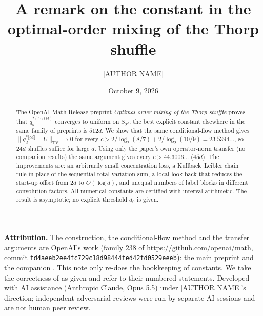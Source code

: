 \documentclass[11pt]{amsart}
\title[Thorp shuffle: a smaller explicit constant]{A remark on the constant in the optimal-order mixing of the Thorp shuffle}
\author{[AUTHOR NAME]}
\date{October 9, 2026}
\theoremstyle{remark}
\newcommand{\TV}{\mathrm{TV}}
\begin{document}
\begin{abstract}
The OpenAI Math Release preprint \emph{Optimal-order mixing of the Thorp shuffle} proves that
$q_d^{*(1600d)}$ converges to uniform on $S_{2^d}$; the best explicit constant elsewhere in the same
family of preprints is $512d$. We show that the same conditional-flow method gives
$\|q_d^{*\lfloor cd\rfloor}-U\|_{\TV}\to0$ for every
$c>2/\log_2(8/7)+2/\log_2(10/9)=23.5394\ldots$, so $24d$ shuffles suffice for large $d$.
Using only the paper's own operator-norm transfer (no companion results) the same argument gives every
$c>44.3006\ldots$ ($45d$). The improvements are: an arbitrarily small concentration loss, a
Kullback--Leibler chain rule in place of the sequential total-variation sum, a local look-back that
reduces the start-up offset from $2d$ to $O(\log d)$, and unequal numbers of label blocks in different
convolution factors. All numerical constants are certified with interval arithmetic. The result is
asymptotic; no explicit threshold $d_0$ is given.
\end{abstract}
\maketitle

\noindent\textbf{Attribution.} The construction, the conditional-flow method and the transfer
arguments are OpenAI's work (family 238 of \url{https://github.com/openai/math}, commit
\nolinkurl{fd4aeeb2ee4fc729c18d98444fed42fd0529eeeb}): the main preprint \cite{oai-thorp} and the
companion \cite{oai-transfer}. This note only re-does the bookkeeping of constants. We take the
correctness of \cite{oai-thorp,oai-transfer} as given and refer to their numbered statements.
Developed with AI assistance (Anthropic Claude, Opus 5.5) under [AUTHOR NAME]'s direction; independent
adversarial reviews were run by separate AI sessions and are not human peer review.
\end{document}
